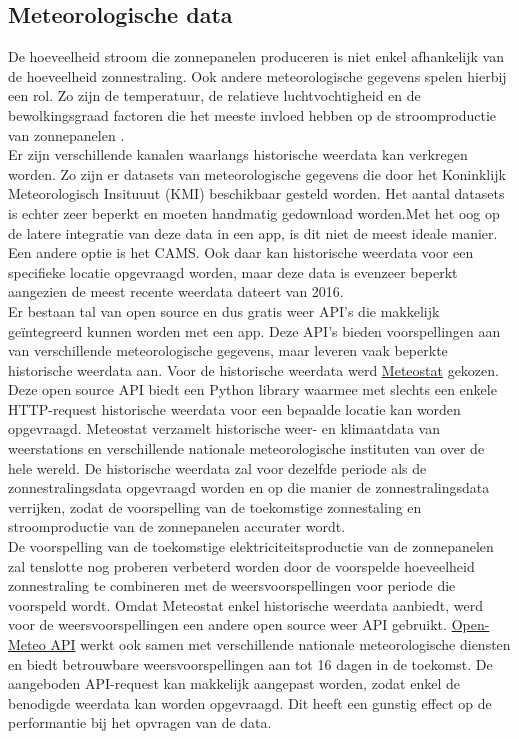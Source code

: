 \subsection{Meteorologische data}

De hoeveelheid stroom die zonnepanelen produceren is niet enkel afhankelijk van de hoeveelheid zonnestraling. Ook andere meteorologische gegevens spelen hierbij een rol. Zo zijn de temperatuur, de relatieve luchtvochtigheid en de bewolkingsgraad factoren die het meeste invloed hebben op de stroomproductie van zonnepanelen \autocite{Sehrawat2023}. \\

Er zijn verschillende kanalen waarlangs historische weerdata kan verkregen worden. Zo zijn er datasets van meteorologische gegevens die door het Koninklijk Meteorologisch Insituuut (KMI) beschikbaar gesteld worden. Het aantal datasets is echter zeer beperkt en moeten handmatig gedownload worden.Met het oog op de latere integratie van deze data in een app, is dit niet de meest ideale manier. Een andere optie is het CAMS. Ook daar kan historische weerdata voor een specifieke locatie opgevraagd worden, maar deze data is evenzeer beperkt aangezien de meest recente weerdata dateert van 2016. \\

Er bestaan tal van open source en dus gratis weer API's die makkelijk geïntegreerd kunnen worden met een app. Deze API's bieden voorspellingen aan van verschillende meteorologische gegevens, maar leveren vaak beperkte historische weerdata aan. Voor de historische weerdata werd \href{https://dev.meteostat.net/}{Meteostat} gekozen. Deze open source API biedt een Python library waarmee met slechts een enkele HTTP-request historische weerdata voor een bepaalde locatie kan worden opgevraagd. Meteostat verzamelt historische weer- en klimaatdata van weerstations en verschillende nationale meteorologische instituten van over de hele wereld. De historische weerdata zal voor dezelfde periode als de zonnestralingsdata opgevraagd worden en op die manier de zonnestralingsdata verrijken, zodat de voorspelling van de toekomstige zonnestaling en stroomproductie van de zonnepanelen accurater wordt. \\

De voorspelling van de toekomstige elektriciteitsproductie van de zonnepanelen zal tenslotte nog proberen verbeterd worden door de voorspelde hoeveelheid zonnestraling te combineren met de weersvoorspellingen voor periode die voorspeld wordt. Omdat Meteostat enkel historische weerdata aanbiedt, werd voor de weersvoorspellingen een andere open source weer API gebruikt. \href{https://open-meteo.com/}{Open-Meteo API} werkt ook samen met verschillende nationale meteorologische diensten en biedt betrouwbare weersvoorspellingen aan tot 16 dagen in de toekomst. De aangeboden API-request kan makkelijk aangepast worden, zodat enkel de benodigde weerdata kan worden opgevraagd. Dit heeft een gunstig effect op de performantie bij het opvragen van de data.

